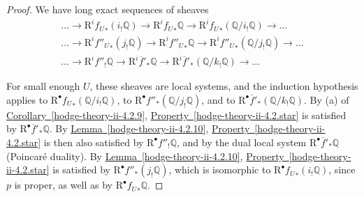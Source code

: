 \begin{proof}
    


    We have long exact sequences of sheaves
    \[       \begin {gathered}         \ldots          \to  \mathrm {R}^i{f_U}_*(i_!\mathbb {Q})         \to  \mathrm {R}^i{f_U}_*\mathbb {Q}         \to  \mathrm {R}^i{f_U}_*(\mathbb {Q}{/}i_!\mathbb {Q})         \to  \ldots        \\\ldots          \to  \mathrm {R}^i{f''_U}_*(j_!\mathbb {Q})         \to  \mathrm {R}^i{f''_U}_*\mathbb {Q}         \to  \mathrm {R}^i{f''_U}_*(\mathbb {Q}{/}j_!\mathbb {Q})         \to  \ldots        \\\ldots          \to  \mathrm {R}^i f''_!\mathbb {Q}         \to  \mathrm {R}^i\overline {f}'_*\mathbb {Q}         \to  \mathrm {R}^i\overline {f}'_*(\mathbb {Q}{/}k_!\mathbb {Q})         \to  \ldots        \end {gathered}     \]\par{}For small enough \(U\), these sheaves are local systems, and the induction hypothesis applies to \(\mathrm {R}^\bullet {f_U}_*(\mathbb {Q}{/}i_!\mathbb {Q})\), to \(\mathrm {R}^\bullet {f''}_*(\mathbb {Q}{/}j_!\mathbb {Q})\), and to \(\mathrm {R}^\bullet \overline {f}'_*(\mathbb {Q}{/}k_!\mathbb {Q})\).
    By (a) of \hyperref[hodge-theory-ii-4.2.9]{Corollary~\ref*{hodge-theory-ii-4.2.9}}, \hyperref[hodge-theory-ii-4.2.star]{Property~\ref*{hodge-theory-ii-4.2.star}} is satisfied by \(\mathrm {R}^\bullet \overline {f}'_*\mathbb {Q}\).
    By \hyperref[hodge-theory-ii-4.2.10]{Lemma~\ref*{hodge-theory-ii-4.2.10}}, \hyperref[hodge-theory-ii-4.2.star]{Property~\ref*{hodge-theory-ii-4.2.star}} is then also satisfied by \(\mathrm {R}^\bullet {f''}_!\mathbb {Q}\), and by the dual local system \(\mathrm {R}^\bullet \overline {f}'_*\mathbb {Q}\) (Poincaré duality).
    By \hyperref[hodge-theory-ii-4.2.10]{Lemma~\ref*{hodge-theory-ii-4.2.10}}, \hyperref[hodge-theory-ii-4.2.star]{Property~\ref*{hodge-theory-ii-4.2.star}} is satisfied by \(\mathrm {R}^\bullet {f''}_*(j_!\mathbb {Q})\), which is isomorphic to \(\mathrm {R}^\bullet {f_U}_*(i_!\mathbb {Q})\), since \(p\) is proper, as well as by \(\mathrm {R}^\bullet {f_U}_*\mathbb {Q}\).

\end{proof}
